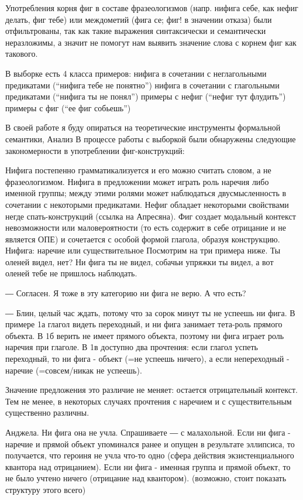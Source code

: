\documentclass{article}
\begin{document}
Употребления корня фиг в составе фразеологизмов (напр. нифига себе, как нефиг делать, фиг тебе) или междометий (фига се; фиг! в значении отказа) были отфильтрованы, так как такие выражения синтаксически и семантически неразложимы, а значит не помогут нам выявить значение слова с корнем фиг как такового.

В выборке есть 4 класса примеров:
нифига в сочетании с неглагольными предикатами (“нифига тебе не понятно”)
нифига в сочетании с глагольными предикатами (“нифига ты не понял”)
примеры с нефиг (“нефиг тут флудить”)
примеры с фиг (“ее фиг собьешь”)

В своей работе я буду опираться на теоретические инструменты формальной семантики, 
Анализ
В процессе работы с выборкой были обнаружены следующие закономерности в употреблении фиг-конструкций:

Нифига постепенно грамматикализуется и его можно считать словом, а не фразеологизмом.
Нифига в предложении может играть роль наречия либо именной группы; между этими ролями может наблюдаться двусмысленность в сочетании с некоторыми предикатами.
Нефиг обладает некоторыми свойствами негде спать-конструкций (ссылка на Апресяна).
Фиг создает модальный контекст невозможности или маловероятности (то есть содержит в себе отрицание и не является ОПЕ) и сочетается с особой формой глагола, образуя конструкцию.
Нифига: наречие или существительное
Посмотрим на три примера ниже.
Ты оленей видел, нет? Ни фига ты не видел, собачьи упряжки ты видел, а вот оленей тебе не пришлось наблюдать. 

 ― Согласен. Я тоже в эту категорию ни фига не верю. А что есть? 

 ― Блин, целый час ждать, потому что за сорок минут ты не успеешь ни фига. 
В примере 1а глагол видеть переходный, и ни фига занимает тета-роль прямого объекта. В 1б верить не имеет прямого объекта, поэтому ни фига играет роль наречия при глаголе. В 1в доступно два прочтения: если глагол успеть переходный, то ни фига - объект (=не успеешь ничего), а если непереходный - наречие (=совсем/никак не успеешь).

Значение предложения это различие не меняет: остается отрицательный контекст. Тем не менее, в некоторых случаях прочтения с наречием и с существительным существенно различны.

Анджела. Ни фига она не учла. Спрашиваете ― с малахольной. 
Если ни фига - наречие и прямой объект упоминался ранее и опущен в результате эллипсиса, то получается, что героиня не учла что-то одно (сфера действия экзистенциального квантора над отрицанием). Если ни фига - именная группа и прямой объект, то не было учтено ничего (отрицание над квантором). (возможно, стоит показать структуру этого всего)
\end{document}
